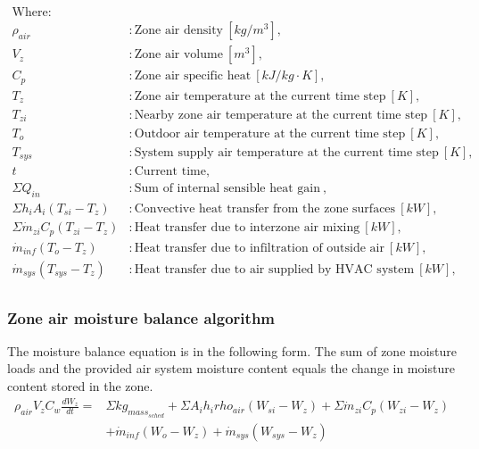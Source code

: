 \begin{align*}
\text{Where: }\\
  \rho_{air} &: \text{Zone air density} ~ [kg/m^{3}], \\
  V_{z} &: \text{Zone air volume} ~ [m^{3}],\\
  C_{p} &: \text{Zone air specific heat} ~ [kJ/kg \cdot K],\\
  T_{z} &: \text{Zone air temperature at the current time step} ~[K],\\
  T_{zi} &: \text{Nearby zone air temperature at the current time step} ~[K],\\
  T_{o} &: \text{Outdoor air temperature at the current time step} ~[K],\\
  T_{sys} &: \text{System supply air temperature at the current time step} ~[K],\\
  t &: \text{Current time},\\
  \Sigma{Q_{in}} &: \text{Sum of internal sensible heat gain} ~ ,\\
  \Sigma{h_i A_i (T_{si}-T_z)} &: \text{Convective heat transfer from the zone surfaces} ~ [kW],\\
  \Sigma{\dot{m}_{zi}C_p(T_{zi}-T_z)} &: \text{Heat transfer due to interzone air mixing} ~ [kW],\\
  \dot{m}_{inf} (T_o - T_z)&: \text{Heat transfer due to infiltration of outside air} ~ [kW],\\
  \dot{m}_{sys} (T_{sys} - T_z)&: \text{Heat transfer due to air supplied by HVAC system} ~ [kW],\\
\end{align*}


\subsubsection{Zone air moisture balance algorithm}\label{Zone-air-moisture-balance-algorithm}
The moisture balance equation is in the following form. The sum of zone moisture loads and the provided air system moisture content equals the change in moisture content stored in the zone. 
\begin{equation}
\begin{aligned}
\rho_{air} V_{z} C_{w}\frac {dW_z} {dt} = &\Sigma{kg_{mass_{sched}}} + \Sigma{A_i h_i rho_{air} (W_{si} - W_z)} + \Sigma{\dot{m}_{zi} C_p (W_{zi}-W_z)} \\
& + \dot{m}_{inf} (W_o - W_z) + \dot{m}_{sys} (W_{sys} - W_z)
\end{aligned}
\end{equation}

